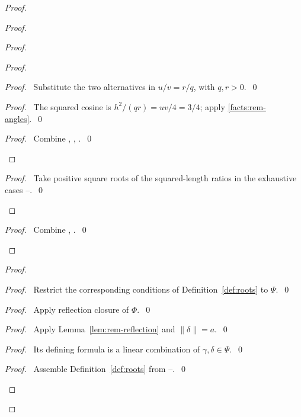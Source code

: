 \begin{proof}
\begin{proof}
\begin{proof}
\begin{proof}
\begin{proof}\pf\ Substitute the two alternatives
 in $u/v=r/q$, with $q,r>0$.~\qed\end{proof}
\begin{proof}\pf\ The squared cosine is $h^2/(qr)=uv/4=3/4$;
apply \ref{facts:rem-angles}.~\qed\end{proof}
\qedstep
\begin{proof}\pf\ Combine ,
, .~\qed\end{proof}
\end{proof}
\qedstep
\begin{proof}\pf\ Take positive square roots of the squared-length
ratios in the exhaustive cases --.~\qed\end{proof}
\end{proof}
\qedstep
\begin{proof}\pf\ Combine , .~\qed\end{proof}
\end{proof}
\begin{proof}
\begin{proof}\pf\ Restrict the corresponding conditions of
Definition~\ref{def:roots} to $\Psi$.~\qed\end{proof}
\begin{proof}\pf\ Apply reflection closure of $\Phi$.~\qed\end{proof}
\begin{proof}\pf\ Apply Lemma~\ref{lem:rem-reflection} and $\|\delta\|=a$.~\qed\end{proof}
\begin{proof}\pf\ Its defining formula is a linear combination of
$\gamma,\delta\in\Psi$.~\qed\end{proof}
\qedstep
\begin{proof}\pf\ Assemble Definition~\ref{def:roots} from
--.~\qed\end{proof}

\end{proof}
\end{proof}
